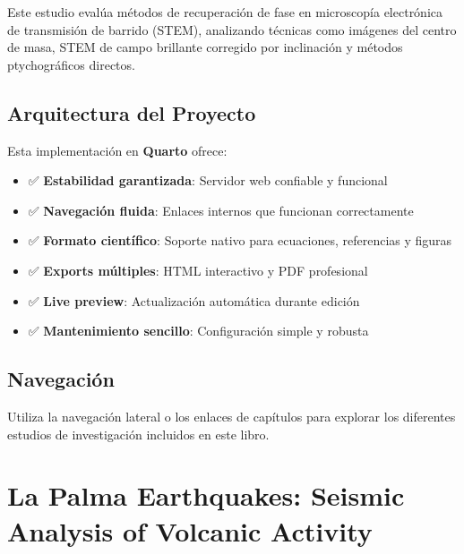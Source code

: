 \documentclass[
  letterpaper,
]{article}
\providecommand{\tightlist}{%
  \setlength{\itemsep}{0pt}\setlength{\parskip}{0pt}}
\begin{document}

Este estudio evalúa métodos de recuperación de fase en microscopía
electrónica de transmisión de barrido (STEM), analizando técnicas como
imágenes del centro de masa, STEM de campo brillante corregido por
inclinación y métodos ptychográficos directos.

\section*{Arquitectura del Proyecto}\label{arquitectura-del-proyecto}


Esta implementación en \textbf{Quarto} ofrece:

\begin{itemize}
\tightlist
\item
  ✅ \textbf{Estabilidad garantizada}: Servidor web confiable y
  funcional
\item
  ✅ \textbf{Navegación fluida}: Enlaces internos que funcionan
  correctamente
\item
  ✅ \textbf{Formato científico}: Soporte nativo para ecuaciones,
  referencias y figuras
\item
  ✅ \textbf{Exports múltiples}: HTML interactivo y PDF profesional
\item
  ✅ \textbf{Live preview}: Actualización automática durante edición
\item
  ✅ \textbf{Mantenimiento sencillo}: Configuración simple y robusta
\end{itemize}

\section*{Navegación}\label{navegaciuxf3n}


Utiliza la navegación lateral o los enlaces de capítulos para explorar
los diferentes estudios de investigación incluidos en este libro.


\chapter{La Palma Earthquakes: Seismic Analysis of Volcanic
Activity}\label{la-palma-earthquakes-seismic-analysis-of-volcanic-activity}
\end{document}
